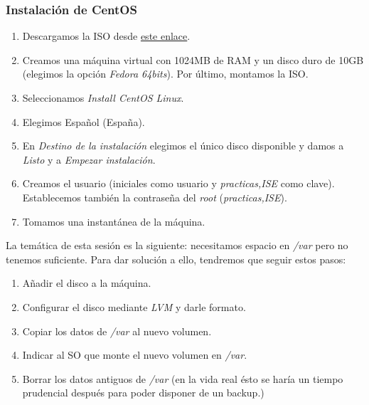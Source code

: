\documentclass[12pt,spanish]{article}
\begin{document}
\subsubsection{Instalación de CentOS}
\begin{enumerate}
	\item Descargamos la ISO desde \href{http://atcproyectos.ugr.es/esriie/ubuntu-16.04.5-server-amd64.iso}{este enlace}.
	\item Creamos una máquina virtual con 1024MB de RAM y un disco duro de 10GB (elegimos la opción \textit{Fedora 64bits}). Por último, montamos la ISO.
	\item Seleccionamos \textit{Install CentOS Linux}.
	\item Elegimos Español (España).
	\item En \textit{Destino de la instalación} elegimos el único disco disponible y damos a \textit{Listo} y a \textit{Empezar instalación}.
	\item Creamos el usuario (iniciales como usuario y \textit{practicas,ISE} como clave). Establecemos también la contraseña del \textit{root} (\textit{practicas,ISE}).
	\item Tomamos una instantánea de la máquina.
\end{enumerate}

La temática de esta sesión es la siguiente: necesitamos espacio en \textit{/var} pero no tenemos suficiente. Para dar solución a ello, tendremos que seguir estos pasos:
\begin{enumerate}
	\item Añadir el disco a la máquina.
	\item Configurar el disco mediante \textit{LVM} y darle formato.
	\item Copiar los datos de \textit{/var} al nuevo volumen.
	\item Indicar al SO que monte el nuevo volumen en \textit{/var}.
	\item Borrar los datos antiguos de \textit{/var} (en la vida real ésto se haría un tiempo prudencial después para poder disponer de un backup.)
\end{enumerate}
\end{document}
